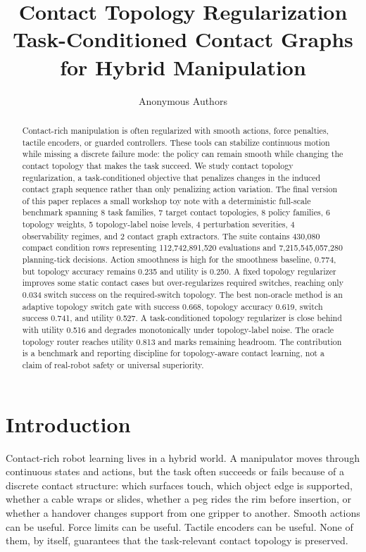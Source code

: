 \documentclass{article}
\title{Contact Topology Regularization\\Task-Conditioned Contact Graphs for Hybrid Manipulation}
\author{Anonymous Authors}
\begin{document}
\maketitle

\begin{abstract}
Contact-rich manipulation is often regularized with smooth actions, force penalties, tactile encoders, or guarded controllers. These tools can stabilize continuous motion while missing a discrete failure mode: the policy can remain smooth while changing the contact topology that makes the task succeed. We study contact topology regularization, a task-conditioned objective that penalizes changes in the induced contact graph sequence rather than only penalizing action variation. The final version of this paper replaces a small workshop toy note with a deterministic full-scale benchmark spanning 8 task families, 7 target contact topologies, 8 policy families, 6 topology weights, 5 topology-label noise levels, 4 perturbation severities, 4 observability regimes, and 2 contact graph extractors. The suite contains 430,080 compact condition rows representing 112,742,891,520 evaluations and 7,215,545,057,280 planning-tick decisions. Action smoothness is high for the smoothness baseline, 0.774, but topology accuracy remains 0.235 and utility is 0.250. A fixed topology regularizer improves some static contact cases but over-regularizes required switches, reaching only 0.034 switch success on the required-switch topology. The best non-oracle method is an adaptive topology switch gate with success 0.668, topology accuracy 0.619, switch success 0.741, and utility 0.527. A task-conditioned topology regularizer is close behind with utility 0.516 and degrades monotonically under topology-label noise. The oracle topology router reaches utility 0.813 and marks remaining headroom. The contribution is a benchmark and reporting discipline for topology-aware contact learning, not a claim of real-robot safety or universal superiority.
\end{abstract}

\section{Introduction}

Contact-rich robot learning lives in a hybrid world. A manipulator moves through continuous states and actions, but the task often succeeds or fails because of a discrete contact structure: which surfaces touch, which object edge is supported, whether a cable wraps or slides, whether a peg rides the rim before insertion, or whether a handover changes support from one gripper to another. Smooth actions can be useful. Force limits can be useful. Tactile encoders can be useful. None of them, by itself, guarantees that the task-relevant contact topology is preserved.
\end{document}
